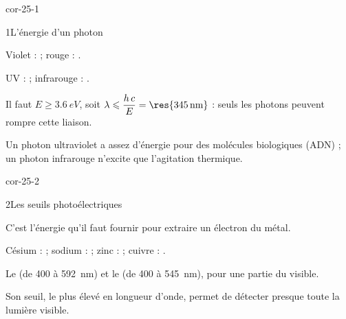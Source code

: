 \corrigesSouples

\begin{blocLivre}{cor-25-1}
\begin{corrige}{1}{L'énergie d'un photon}
\begin{questions}
\item Violet :  ; rouge : .
\item UV :  ; infrarouge : .
\item Il faut $E\geqslant\qty{3,6}{eV}$, soit $\lambda\leqslant\dfrac{h\,c}{E}=\res{\qty{345}{nm}}$ : seuls les photons  peuvent
rompre cette liaison.
\item Un photon ultraviolet a assez d'énergie pour  des molécules biologiques (ADN) ; un
photon infrarouge n'excite que l'agitation thermique.
\end{questions}
\end{corrige}
\end{blocLivre}
\begin{blocLivre}{cor-25-2}
\begin{corrige}{2}{Les seuils photoélectriques}
\begin{questions}
\item C'est l'énergie  qu'il faut fournir pour extraire un électron du métal.
\item Césium :  ; sodium :  ; zinc :  ; cuivre : .
\item Le  (de 400 à \qty{592}{nm}) et le  (de 400 à \qty{545}{nm}), pour une partie du visible.
\item Son seuil, le plus élevé en longueur d'onde, permet de détecter presque toute la lumière visible.
\end{questions}
\end{corrige}
\end{blocLivre}
